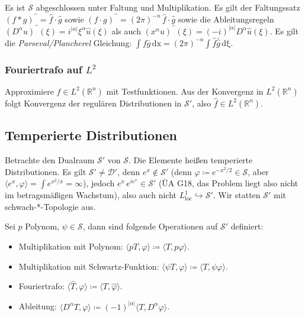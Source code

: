 \documentclass[11pt,a4paper]{scrartcl}
\newcommand{\R}{\mathbb{R}} %
\newcommand{\D}{\mathcal{D}}
\newcommand{\Sc}{\mathcal{S}}
\newcommand{\circum}{\text{\textasciicircum}}
\theoremstyle{plain}
\theoremstyle{definition}
\theoremstyle{remark}
\DeclareMathOperator{\loc}{loc}
\begin{document}
Es ist $\Sc$ abgeschlossen unter Faltung und Multiplikation. Es gilt der Faltungssatz $(f*g)^{\mbox{\textasciicircum}} = \hat f \cdot \hat g$ sowie $(f\cdot g)^{\mbox{\textasciicircum}} = (2\pi)^{-n} \, \hat f \cdot \hat g$ sowie die Ableitungsregeln $(D^\alpha u)^\circum(\xi) = i^{|\alpha|} \xi^\alpha \hat u(\xi)$ als auch $(x^\alpha u)^\circum(\xi) = (-i)^{|\alpha|} D^\alpha \hat u(\xi)$. Es gilt die \emph{Parseval/Plancherel} Gleichung: $\int f\bar g \, \mathrm{dx} = (2\pi)^{-n} \int \hat f \bar{\hat g} \, \mathrm{d\xi}$.

\subsubsection{Fouriertrafo auf $L^2$}

Approximiere $f\in L^2(\R^n)$ mit Testfunktionen. Aus der Konvergenz in $L^2(\R^n)$ folgt Konvergenz der regulären Distributionen in $\Sc'$, also $\hat f \in L^2(\R^n)$.

\subsection{Temperierte Distributionen}

Betrachte den Dualraum $\Sc'$ von $\Sc$. Die Elemente heißen temperierte Distributionen. Es gilt $\Sc'\neq \D'$, denn $e^x\not\in \Sc'$ (denn $\varphi\coloneqq e^{-x^2/2}\in \Sc$, aber $\langle e^x, \varphi \rangle = \int e^{x^2/x} = \infty$), jedoch $e^x\, e^{ie^x} \in \Sc'$ (ÜA G18, das Problem liegt also nicht im betragsmäßigen Wachstum), also auch nicht $L^1_{\loc} \hookrightarrow \Sc'$. Wir statten $\Sc'$ mit schwach-*-Topologie aus.

Sei $p$ Polynom, $\psi\in \Sc$, dann sind folgende Operationen auf $\Sc'$ definiert:

\begin{itemize}
    \item Multiplikation mit Polynom: $\langle pT, \varphi \rangle \coloneqq \langle T, p\varphi \rangle$.
    \item Multiplikation mit Schwartz-Funktion: $\langle \psi T, \varphi \rangle \coloneqq \langle T, \psi\varphi \rangle$.
    \item Fouriertrafo: $\langle \hat T, \varphi \rangle \coloneqq \langle T, \hat\varphi \rangle$.
    \item Ableitung: $\langle D^\alpha T, \varphi \rangle \coloneqq (-1)^{|\alpha|} \langle T, D^\alpha \varphi \rangle$.
\end{itemize}
\end{document}
